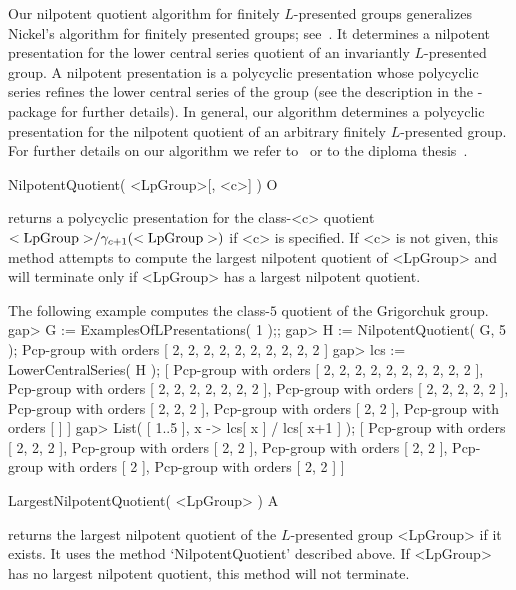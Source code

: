 

Our nilpotent quotient algorithm for finitely $L$-presented groups
generalizes Nickel's algorithm for finitely presented groups;
see~\cite{Nickel96}. It determines a nilpotent presentation for the lower
central series quotient of an invariantly $L$-presented group. A nilpotent
presentation is a polycyclic presentation whose polycyclic series refines
the lower central series of the group (see the description
in the {\NQ}-package for further details). In general, our algorithm
determines a polycyclic presentation for the nilpotent quotient of
an arbitrary finitely $L$-presented group. For further details on our
algorithm we refer to~\cite{BEH08} or to the diploma thesis~\cite{H08}.



\> NilpotentQuotient( <LpGroup>[, <c>] ) O

returns a polycyclic presentation for the class-<c> quotient ${\rm
<LpGroup>}/\gamma_{c+1}({\rm <LpGroup>})$ if <c> is specified.  If <c>
is not given, this method attempts to compute the largest nilpotent
quotient of <LpGroup> and will terminate only if <LpGroup> has a largest
nilpotent quotient.

The following example computes the class-$5$ quotient of the Grigorchuk
group.
\beginexample
gap> G := ExamplesOfLPresentations( 1 );;
gap> H := NilpotentQuotient( G, 5 );
Pcp-group with orders [ 2, 2, 2, 2, 2, 2, 2, 2, 2, 2 ] 
gap> lcs := LowerCentralSeries( H );
[ Pcp-group with orders [ 2, 2, 2, 2, 2, 2, 2, 2, 2, 2 ], 
  Pcp-group with orders [ 2, 2, 2, 2, 2, 2, 2 ], 
  Pcp-group with orders [ 2, 2, 2, 2, 2 ], Pcp-group with orders [ 2, 2, 2 ], 
  Pcp-group with orders [ 2, 2 ], Pcp-group with orders [  ] ]
gap> List( [ 1..5 ], x -> lcs[ x ] / lcs[ x+1 ] ); 
[ Pcp-group with orders [ 2, 2, 2 ], Pcp-group with orders [ 2, 2 ], 
  Pcp-group with orders [ 2, 2 ], Pcp-group with orders [ 2 ], 
  Pcp-group with orders [ 2, 2 ] ]
\endexample

\> LargestNilpotentQuotient( <LpGroup> )  A

returns the largest nilpotent quotient of the $L$-presented group
<LpGroup> if it exists. It uses the method `NilpotentQuotient' described
above. If <LpGroup> has no largest nilpotent quotient, this method will
not terminate.

